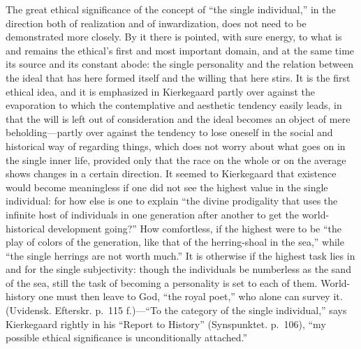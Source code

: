 \documentclass[12pt,a4paper]{book}
\newcommand{\opage}[1]{\marginnote{\footnotesize\textit{[#1]}}}
\begin{document}
The great ethical significance of the concept of ``the single
individual,'' in the direction both of realization and of inwardization,
does not need to be demonstrated more closely. By it there is pointed,
with sure energy, to what is and remains the ethical's first and most
important domain, and at the same time its source and its constant abode:
the single personality and the relation between the ideal that has here
formed itself and the willing that here stirs. It is the first ethical
idea, and it is emphasized in Kierkegaard partly over against the
evaporation to which the contemplative and aesthetic tendency easily
leads, in that the will is left out of consideration and the ideal
becomes an object of mere beholding---partly over against the tendency to
lose oneself in the social and historical way of regarding things, which
does not worry about what goes on in the single inner life, provided only
that the race on the whole or on the average shows changes in a certain
direction. It seemed to Kierkegaard that existence would become
meaningless if one did not see the highest value in the single
individual: for how else is one to explain ``the divine prodigality that
uses the infinite host of individuals in one generation after another
\opage{103}to get the world-historical development going?'' How
comfortless, if the highest were to be ``the play of colors of the
generation, like that of the herring-shoal in the sea,'' while ``the single
herrings are not worth much.'' It is otherwise if the highest task lies in
and for the single subjectivity: though the individuals be numberless as
the sand of the sea, still the task of becoming a personality is set to
each of them. World-history one must then leave to God, ``the royal
poet,'' who alone can survey it.
(Uvidensk. Efterskr. p.~115 f.)---``To the category of the single
individual,'' says Kierkegaard rightly in his ``Report to History''
(Synspunktet. p.~106), ``my possible ethical significance is
unconditionally attached.''
\end{document}
